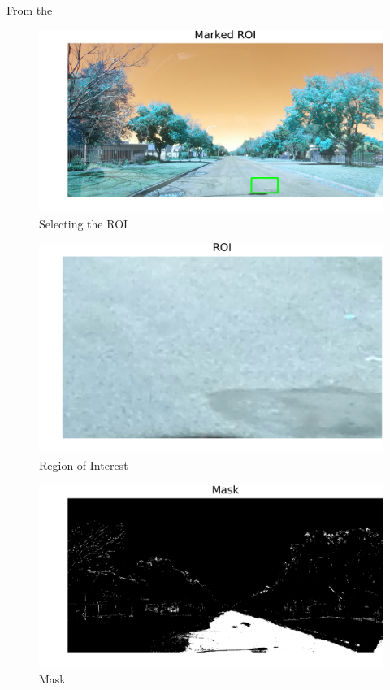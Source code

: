 \documentclass[journal]{IEEEtran}
\begin{document}
From the 
\begin{figure}[!htb]
\begin{center}
\includegraphics[scale=0.25]{Images/2_Marked_ROI.png}
\end{center}
\caption{Selecting the ROI}
\end{figure}

\begin{figure}[!htb]
\begin{center}
\includegraphics[scale=0.25]{Images/3_ROI.png}
\end{center}
\caption{Region of Interest}
\end{figure}

\begin{figure}[!htb]
\begin{center}
\includegraphics[scale=0.25]{Images/4_Mask.png}
\end{center}
\caption{Mask}
\end{figure}
\end{document}
